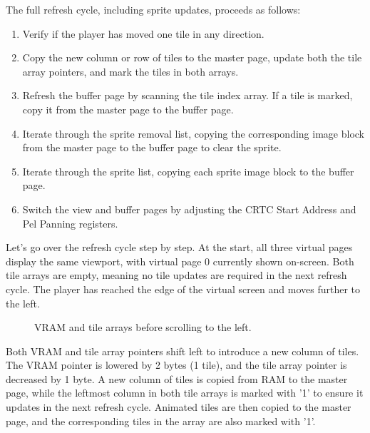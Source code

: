 \documentclass[book.tex]{subfiles}
\begin{document}
\par
The full refresh cycle, including sprite updates, proceeds as follows:
\begin{enumerate}
  \item Verify if the player has moved one tile in any direction.
  \item Copy the new column or row of tiles to the master page, update both the tile array pointers, and mark the tiles in both arrays.
  \item Refresh the buffer page by scanning the tile index array. If a tile is marked, copy it from the master page to the buffer page.
  \item Iterate through the sprite removal list, copying the corresponding image block from the master page to the buffer page to clear the sprite.
  \item Iterate through the sprite list, copying each sprite image block to the buffer page.
  \item Switch the view and buffer pages by adjusting the CRTC Start Address and Pel Panning registers.
\end{enumerate}


\vspace{0.5cm}
\par
\begin{minipage}{\textwidth}
  
\end{minipage}
\label{state_type}


\pagebreak
Let's go over the refresh cycle step by step. At the start, all three virtual pages display the same viewport, with virtual page 0 currently shown on-screen. Both tile arrays are empty, meaning no tile updates are required in the next refresh cycle. The player has reached the edge of the virtual screen and moves further to the left. \\

\begin{figure}[H]
\centering
 \caption{VRAM and tile arrays before scrolling to the left.}
 \label{fig:kc4_6_step0}
\end{figure}

\pagebreak
Both VRAM and tile array pointers shift left to introduce a new column of tiles. The VRAM pointer is lowered by 2 bytes (1 tile), and the tile array pointer is decreased by 1 byte.
A new column of tiles is copied from RAM to the master page, while the leftmost column in both tile arrays is marked with '1' to ensure it updates in the next refresh cycle. Animated tiles are then copied to the master page, and the corresponding tiles in the array are also marked with '1'.\\
\end{document}
